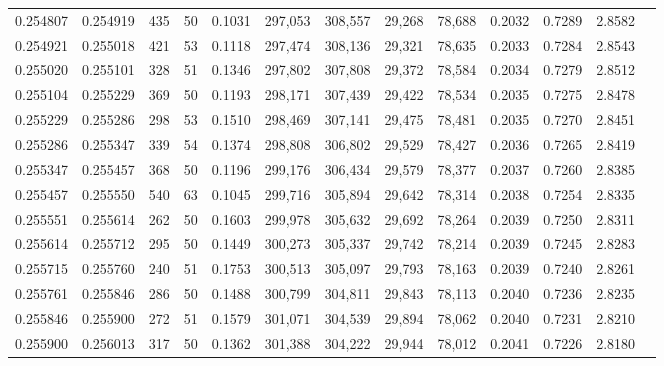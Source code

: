 \begin{tabular}{rrrrrrrrrrrrr}
0.254807 & 0.254919 &   435 &  50 &                                     0.1031 & 297,053 & 308,557 &  29,268 &  78,688 & 0.2032 & 0.7289 & 2.8582 \\
0.254921 & 0.255018 &   421 &  53 &                                     0.1118 & 297,474 & 308,136 &  29,321 &  78,635 & 0.2033 & 0.7284 & 2.8543 \\
0.255020 & 0.255101 &   328 &  51 &                                     0.1346 & 297,802 & 307,808 &  29,372 &  78,584 & 0.2034 & 0.7279 & 2.8512 \\
0.255104 & 0.255229 &   369 &  50 &                                     0.1193 & 298,171 & 307,439 &  29,422 &  78,534 & 0.2035 & 0.7275 & 2.8478 \\
0.255229 & 0.255286 &   298 &  53 &                                     0.1510 & 298,469 & 307,141 &  29,475 &  78,481 & 0.2035 & 0.7270 & 2.8451 \\
0.255286 & 0.255347 &   339 &  54 &                                     0.1374 & 298,808 & 306,802 &  29,529 &  78,427 & 0.2036 & 0.7265 & 2.8419 \\
0.255347 & 0.255457 &   368 &  50 &                                     0.1196 & 299,176 & 306,434 &  29,579 &  78,377 & 0.2037 & 0.7260 & 2.8385 \\
0.255457 & 0.255550 &   540 &  63 &                                     0.1045 & 299,716 & 305,894 &  29,642 &  78,314 & 0.2038 & 0.7254 & 2.8335 \\
0.255551 & 0.255614 &   262 &  50 &                                     0.1603 & 299,978 & 305,632 &  29,692 &  78,264 & 0.2039 & 0.7250 & 2.8311 \\
0.255614 & 0.255712 &   295 &  50 &                                     0.1449 & 300,273 & 305,337 &  29,742 &  78,214 & 0.2039 & 0.7245 & 2.8283 \\
0.255715 & 0.255760 &   240 &  51 &                                     0.1753 & 300,513 & 305,097 &  29,793 &  78,163 & 0.2039 & 0.7240 & 2.8261 \\
0.255761 & 0.255846 &   286 &  50 &                                     0.1488 & 300,799 & 304,811 &  29,843 &  78,113 & 0.2040 & 0.7236 & 2.8235 \\
0.255846 & 0.255900 &   272 &  51 &                                     0.1579 & 301,071 & 304,539 &  29,894 &  78,062 & 0.2040 & 0.7231 & 2.8210 \\
0.255900 & 0.256013 &   317 &  50 &                                     0.1362 & 301,388 & 304,222 &  29,944 &  78,012 & 0.2041 & 0.7226 & 2.8180 \\

\end{tabular}
